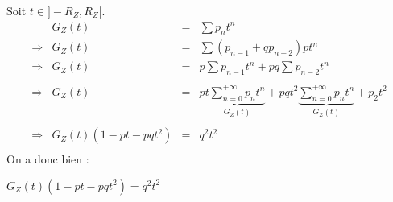 Soit $t\in]-R_Z, R_Z[$.
\[
  \begin{array}{rrcl}
                & G_Z(t)             & = & \sum p_n t^n                                                                                                                              \\
    \Rightarrow & G_Z(t)             & = & \sum (p_{n-1} + qp_{n-2}) pt^n                                                                                                            \\
    \Rightarrow & G_Z(t)             & = & p\sum p_{n-1}t^n +  pq\sum p_{n-2} t^n                                                                                                    \\\\
    \Rightarrow & G_Z(t)             & = & pt\underbrace{\sum\limits_{n=0}^{+\infty} p_{n}t^n}_{G_Z(t)} + pqt^2\underbrace{\sum\limits_{n=0}^{+\infty}  p_{n} t^n}_{G_Z(t)} + p_2t^2 \\\\
    \Rightarrow & G_Z(t)(1-pt-pqt^2) & = & q^2t^2                                                                                                                                    \\
  \end{array}
\]
On a donc bien :
\begin{result}
  $G_Z(t)(1-pt-pqt^2) = q^2t^2$
\end{result}
